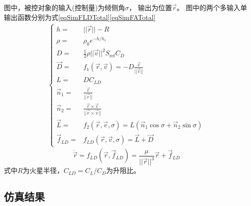 图中，被控对象的输入(控制量)为倾侧角$\sigma$，
输出为位置$\vec{r}$。
图中的两个多输入单输出函数分别为式\eqref{eqSimFLDTotal}\eqref{eqSimFATotal}
\begin{align}
    \left\{\begin{aligned}
    h =& ||\vec{r}||-R \\
    \rho =& \rho_0e^{-h/h_s} \\
    D =& \frac{1}{2}\rho||\vec{v}||^2S_{\text{ref}}C_D \\
    \vec{D} =& f_1(\vec{r},\vec{v}) = -D\frac{\vec{v}}{||\vec{v}||} \\
    L =& DC_{LD} \\
    \vec{n}_1 =& \frac{\vec{r}}{||\vec{r}||} \\
    \vec{n}_2 =& \frac{\vec{r}\times\vec{v}}{||\vec{r}\times\vec{v}||} \\
    \vec{L} =& f_2(\vec{r},\vec{v},\sigma) = L(\vec{n}_1\cos\sigma + \vec{n}_2\sin\sigma) \\
    \vec{f}_{LD} =& f_{LD}(\vec{r},\vec{v},\sigma) = \vec{L} + \vec{D}
\end{aligned}\right. \label{eqSimFLDTotal}
\end{align}
\begin{equation}
    \ddot{\vec{r}} = f_{LD}(\vec{r},\vec{f}_{LD}) = \frac{\mu}{||\vec{r}||^3}\vec{r}+\vec{f}_{LD} \label{eqSimFATotal}
\end{equation}
式中$R$为火星半径，$C_{LD}=C_L/C_D$为升阻比。

\subsection{仿真结果}

